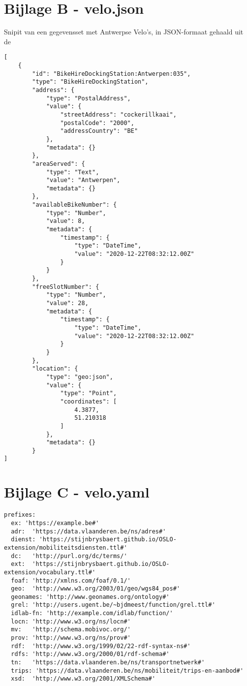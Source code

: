 \begin{appendices}
\section*{Bijlage B - velo.json}
\label{app:velo.json}
Snipit van een gegevensset met Antwerpse Velo's, in JSON-formaat gehaald uit de 
\begin{code}
\begin{verbatim}
[
    {
        "id": "BikeHireDockingStation:Antwerpen:035",
        "type": "BikeHireDockingStation",
        "address": {
            "type": "PostalAddress",
            "value": {
                "streetAddress": "cockerillkaai",
                "postalCode": "2000",
                "addressCountry": "BE"
            },
            "metadata": {}
        },
        "areaServed": {
            "type": "Text",
            "value": "Antwerpen",
            "metadata": {}
        },
        "availableBikeNumber": {
            "type": "Number",
            "value": 8,
            "metadata": {
                "timestamp": {
                    "type": "DateTime",
                    "value": "2020-12-22T08:32:12.00Z"
                }
            }
        },
        "freeSlotNumber": {
            "type": "Number",
            "value": 28,
            "metadata": {
                "timestamp": {
                    "type": "DateTime",
                    "value": "2020-12-22T08:32:12.00Z"
                }
            }
        },
        "location": {
            "type": "geo:json",
            "value": {
                "type": "Point",
                "coordinates": [
                    4.3877,
                    51.210318
                ]
            },
            "metadata": {}
        }
]
\end{verbatim}
\end{code}

\section*{Bijlage C - velo.yaml}
\label{app:velo.yaml}

\begin{code}
\begin{verbatim}
prefixes:
  ex: 'https://example.be#'
  adr:  'https://data.vlaanderen.be/ns/adres#'
  dienst: 'https://stijnbrysbaert.github.io/OSLO-extension/mobiliteitsdiensten.ttl#'
  dc:   'http://purl.org/dc/terms/'
  ext:  'https://stijnbrysbaert.github.io/OSLO-extension/vocabulary.ttl#'
  foaf: 'http://xmlns.com/foaf/0.1/'
  geo:  'http://www.w3.org/2003/01/geo/wgs84_pos#'
  geonames: 'http://www.geonames.org/ontology#'
  grel: 'http://users.ugent.be/~bjdmeest/function/grel.ttl#'
  idlab-fn: 'http://example.com/idlab/function/'
  locn: 'http://www.w3.org/ns/locn#'
  mv:   'http://schema.mobivoc.org/'
  prov: 'http://www.w3.org/ns/prov#'
  rdf:  'http://www.w3.org/1999/02/22-rdf-syntax-ns#'
  rdfs: 'http://www.w3.org/2000/01/rdf-schema#'
  tn:   'https://data.vlaanderen.be/ns/transportnetwerk#'
  trips: 'https://data.vlaanderen.be/ns/mobiliteit/trips-en-aanbod#'
  xsd:  'http://www.w3.org/2001/XMLSchema#'


\end{verbatim}
\end{code}
\end{appendices}
